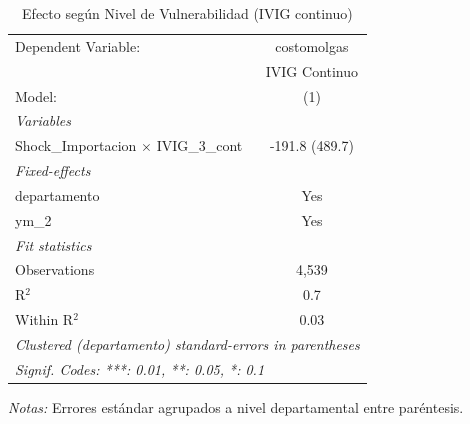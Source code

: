\documentclass[12pt]{article}
\begin{document}
\setcounter{table}{8}
\begin{table}[htbp]
\centering
\begin{threeparttable}

   \caption{Efecto según Nivel de Vulnerabilidad (IVIG continuo)}
   \centering
   \small
   \begin{tabular}{lc}
      \tabularnewline \midrule \midrule
      Dependent Variable:                           & costomolgas\\  
                                                    & IVIG Continuo \\   
      Model:                                        & (1)\\  
      \midrule
      \emph{Variables}\\
      Shock\_Importacion $\times$ IVIG\_3\_cont     & -191.8 (489.7)\\   
      \midrule
      \emph{Fixed-effects}\\
      departamento                                  & Yes\\  
      ym\_2                                         & Yes\\  
      \midrule
      \emph{Fit statistics}\\
      Observations                                  & 4,539\\  
      R$^2$                                         & 0.7\\  
      Within R$^2$                                  & 0.03\\  
      \midrule \midrule
      \multicolumn{2}{l}{\emph{Clustered (departamento) standard-errors in parentheses}}\\
      \multicolumn{2}{l}{\emph{Signif. Codes: ***: 0.01, **: 0.05, *: 0.1}}\\
   \end{tabular}


\begin{tablenotes}
\footnotesize
\item \textit{Notas:} Errores estándar agrupados a nivel departamental entre paréntesis.
\end{tablenotes}
\end{threeparttable}
\end{table}
\end{document}
